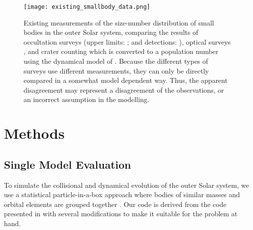 \documentclass[printer]{aa}
\begin{document}
\begin{figure}
    \centering
    \texttt{[image: existing\_smallbody\_data.png]}
    \caption{Existing measurements of the size-number distribution of small bodies in the outer Solar system, comparing the results of occultation surveys (upper limits: \citealt{2008AJ....135.1039B,2009AJ....138..568B,2010AJ....139.2003W,2013MNRAS.429.1626C,2013AJ....146...14Z}; and detections: \citealt{2012ApJ...761..150S, 2015MNRAS.446..932L,2019NatAs...3..301A,2020submitted}), optical surveys \citep{2014ApJ...782..100F}, and crater counting \citep{2019Sci...363..955S} which is converted to a population number using the dynamical model of \citet{2015Icar..258..267G}.  Because the different types of surveys use different measurements, they can only be directly compared in a somewhat model dependent way.  Thus, the apparent disagreement may represent a disagreement of the observations, or an incorrect assumption in the modelling.}
    \label{fig:smallBodyObservations}
\end{figure}

\section{Methods}

\label{sec:methods}

\subsection{Single Model Evaluation}

To simulate the collisional and dynamical evolution of the outer Solar system, we use a statistical particle-in-a-box approach where bodies of similar masses and orbital elements are grouped together \citep{1969edo..book.....S}.  Our code is derived from the code presented in \citet{2015ApJ...801...15S, 2016ApJ...818..175S} with several modifications to make it suitable for the problem at hand.
\end{document}
